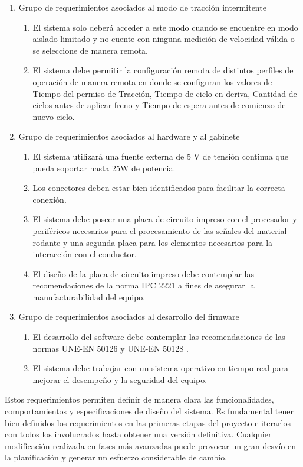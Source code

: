 \begin{enumerate}
    \item Grupo de requerimientos asociados al modo de tracción intermitente
    \begin{enumerate}
        \item El sistema solo deberá acceder a este modo cuando se encuentre en modo aislado limitado y no cuente con ninguna medición de velocidad válida o se seleccione de manera remota.
        \item El sistema debe permitir la configuración remota de distintos perfiles de operación de manera remota en donde se configuran los valores de Tiempo del permiso de Tracción, Tiempo de ciclo en deriva, Cantidad de ciclos antes de aplicar freno y Tiempo de espera antes de comienzo de nuevo ciclo.
    \end{enumerate}
       \vspace{1cm}
    \item Grupo de requerimientos asociados al hardware y al gabinete
    \begin{enumerate}
        \item El sistema utilizará una fuente externa de 5 V de tensión continua que pueda soportar hasta 25W de potencia.
        \item Los conectores deben estar bien identificados para facilitar la correcta conexión.
        \item El sistema debe poseer una placa de circuito impreso con el procesador y periféricos necesarios para el procesamiento de las señales del material rodante y una segunda placa para los elementos necesarios para la interacción con el conductor.
        \item El diseño de la placa de circuito impreso debe contemplar las recomendaciones de la norma IPC 2221 \cite{norma_ipc2221} a fines de asegurar la manufacturabilidad del equipo. 
    \end{enumerate}
           
    \item Grupo de requerimientos asociados al desarrollo del firmware
    \begin{enumerate}
        \item El desarrollo del software debe contemplar las recomendaciones de las normas UNE-EN 50126 y UNE-EN 50128 \cite{norma_50128}.
        \item El sistema debe trabajar con un sistema operativo en tiempo real para mejorar el desempeño y la seguridad del equipo.
    \end{enumerate}
\end{enumerate}



Estos requerimientos permiten definir de manera clara las funcionalidades, comportamientos y especificaciones de diseño del sistema. Es fundamental tener bien definidos los requerimientos en las primeras etapas del proyecto e iterarlos con todos los involucrados hasta obtener una versión definitiva. Cualquier modificación realizada en fases más avanzadas puede provocar un gran desvío en la planificación y generar un esfuerzo considerable de cambio.